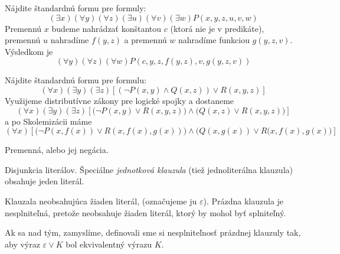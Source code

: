 \begin{priklad}
    Nájdite štandardnú formu pre formuly:
    \begin{equation*}
        (\exists x) (\forall y) (\forall z) (\exists u) (\forall v) (\exists w)
        P(x,y,z,u,v,w)
    \end{equation*}
    Premennú $x$ budeme nahrádzať konštantou $c$ (ktorá nie je v predikáte),
    premennú $u$ nahradíme $f(y,z)$ a
    premennú $w$ nahradíme funkciou $g(y,z,v)$. Výsledkom je
    \begin{equation*}
        (\forall y)(\forall z)(\forall w) P(c,y,z,f(y,z),v,g(y,z,v))
    \end{equation*}
\end{priklad}

\begin{priklad}
    Nájdite štandardnú formu pre formulu:
    \begin{equation*}
        (\forall x)(\exists y) (\exists z) 
        \left[ (\neg P(x,y) \land Q(x,z))\lor R(x,y,z)\right]
    \end{equation*}
    Využijeme distributívne zákony pre logické spojky a dostaneme
    \begin{equation*}
        (\forall x) (\exists y) (\exists z)
        \left[ \Big(\neg P(x,y) \lor R(x,y,z)\Big) \land
            \Big(Q(x,z)\lor R(x,y,z)\Big)\right]
    \end{equation*}
    a po Skolemizácii máme
    \begin{equation*}
        (\forall x) \left[
            \Big(\neg P(x,f(x)) \lor R(x,f(x),g(x)) \Big) \land
            \Big( Q(x,g(x))\lor R(x,f(x),g(x) \Big) \right]
    \end{equation*}
\end{priklad}


\begin{definicia}[Literál]
    Premenná, alebo jej negácia.
\end{definicia}
\begin{definicia}[Klauzula]
    Disjunkcia literálov.
    Špeciálne \emph{jednotková klauzula} (tiež jednoliterálna klauzula)
    obsahuje jeden literál. 
\end{definicia}

\begin{definicia}
    Klauzala neobsahujúca žiaden literál, (označujeme ju $\varepsilon$).
    Prázdna klauzula je nesplniteľná, pretože neobsahuje žiaden
    literál, ktorý by mohol byť splniteľný.    
\end{definicia}
\begin{poznamka}
    Ak sa nad tým, zamyslíme, definovali sme si nesplniteľnosť
    prázdnej klauzuly tak, aby výraz $\varepsilon \lor K$ bol
    ekvivalentný výrazu $K$.
\end{poznamka}

